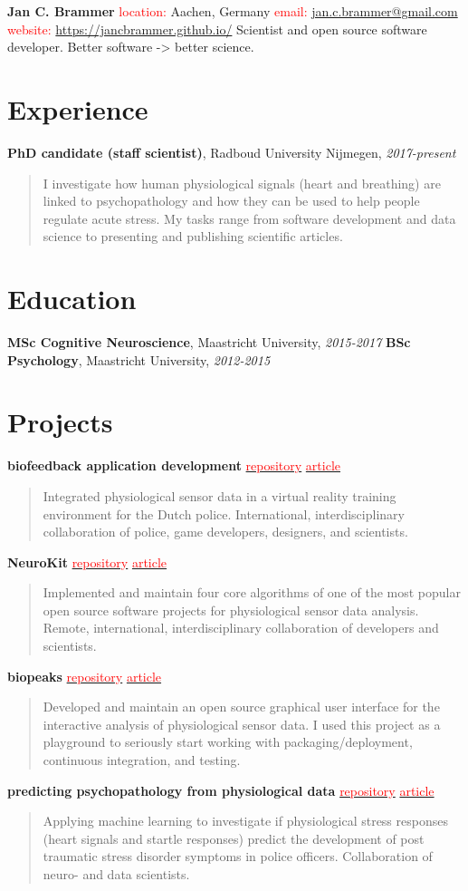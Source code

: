 \documentclass[a4paper, 10pt]{article}
\newcommand{\Head}[3]{
    \noindent \textbf{\Huge Jan C. Brammer} \bigskip \newline
    \textcolor{red}{location:} Aachen, Germany \newline
    \textcolor{red}{email:} \href{mailto:#1}{#1} \newline
    \textcolor{red}{website:} \url{#2} \bigskip \newline
    {#3}
}
\newcommand{\NewSection}[1]{\section*{\Large #1 \hrulefill}}
\newcommand{\EducationItem}[3]{\textbf{#1}, #2, \textit{#3} \newline}
\newcommand{\ExperienceItem}[4]{\textbf{#1}, #2, \textit{#3} {\newline \begin{quote}  \vspace{-\baselineskip} #4 \vspace{\baselineskip} \end{quote}}}
\newcommand{\Project}[4]{\noindent \textbf{#1} \newline
    \href{#2}{\textcolor{red}{repository}} \textbar{} \href{#3}{\textcolor{red}{article}} \newline
    \begin{quote} \vspace{-\baselineskip} #4 \vspace{\baselineskip} \end{quote}
}
\begin{document}
\Head{jan.c.brammer@gmail.com}
{https://jancbrammer.github.io/}
{Scientist and open source software developer. Better software -> better science.}


\NewSection{Experience}
\ExperienceItem{PhD candidate (staff scientist)}
{Radboud University Nijmegen}
{2017-present}
{I investigate how human physiological signals (heart and breathing) are linked to psychopathology and how they can be used to help people regulate acute stress. My tasks range from software development and data science to presenting and publishing scientific articles.}


\NewSection{Education}
\EducationItem{MSc Cognitive Neuroscience}{Maastricht University}{2015-2017}
\EducationItem{BSc Psychology}{Maastricht University}{2012-2015}


\NewSection{Projects}
\Project{biofeedback application development}
{}
{https://doi.org/10.3389/fpsyg.2021.586553}
{Integrated physiological sensor data in a virtual reality training environment for the Dutch police. International, interdisciplinary collaboration of police, game developers, designers, and scientists.}

\Project{NeuroKit}
{https://github.com/neuropsychology/NeuroKit}
{https://github.com/JanCBrammer/JanCBrammer.github.io/raw/gh-pages/neurokit_article.pdf}
{Implemented and maintain four core algorithms of one of the most popular open source software projects for physiological sensor data analysis. Remote, international, interdisciplinary collaboration of developers and scientists.}

\pagebreak
\Project{biopeaks}
{https://github.com/JanCBrammer/biopeaks}
{https://github.com/JanCBrammer/JanCBrammer.github.io/raw/gh-pages/biopeaks_article.pdf}
{Developed and maintain an open source graphical user interface for the interactive analysis of physiological sensor data. I used this project as a playground to seriously start working with packaging/deployment, continuous integration, and testing.}

\Project{predicting psychopathology from physiological data}
{https://github.com/JanCBrammer/PoliceInAction_PTSD_prediction}
{https://osf.io/3kjua/}
{Applying machine learning to investigate if physiological stress responses (heart signals and startle responses) predict the development of post traumatic stress disorder symptoms in police officers. Collaboration of neuro- and data scientists.}
\end{document}
